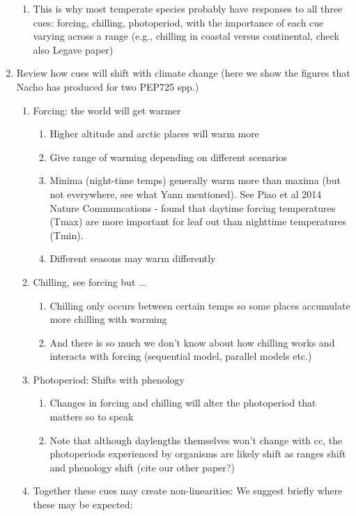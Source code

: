 \documentclass[11pt,letterpaper]{article}
\begin{document}
\begin{enumerate}
\begin{enumerate}
\item This is why most temperate species probably have responses to all three cues: forcing, chilling, photoperiod, with the importance of each cue varying across a range (e.g., chilling in coastal versus continental, check also Legave paper)
\end{enumerate}
\item Review how cues will shift with climate change (here we show the figures that Nacho has produced for two PEP725 spp.) %
\begin{enumerate}
\item Forcing: the world will get warmer 
\begin{enumerate}
\item Higher altitude and arctic places will warm more
\item Give range of warming depending on different scenarios
\item Minima (night-time temps) generally warm more than maxima (but not everywhere, see what Yann mentioned). See Piao et al 2014 Nature Communcations - found that daytime forcing temperatures (Tmax) are more important for leaf out than nighttime temperatures (Tmin).
\item Different seasons may warm differently
\end{enumerate}
\item Chilling, see forcing but ... 
\begin{enumerate}
\item Chilling only occurs between certain temps so some places accumulate more chilling with warming
\item And there is so much we don't know about how chilling works and interacts with forcing (sequential model, parallel models etc.)
\end{enumerate}
\item Photoperiod: Shifts with phenology
\begin{enumerate}
\item Changes in forcing and chilling will alter the photoperiod that matters so to speak
\item Note that although daylengths themselves won't change with cc, the photoperiods experienced by organisms are likely shift as ranges shift and phenology shift (cite our other paper?)
\end{enumerate}
\item Together these cues may create non-linearities: We suggest briefly where these may be expected:

\end{enumerate}
\end{enumerate}
\end{document}
